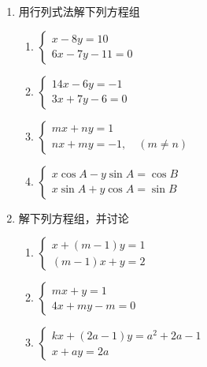 \begin{ex}
\begin{enumerate}
    \item 用行列式法解下列方程组
\begin{enumerate}
    \item $\begin{cases}
        x-8y=10\\6x-7y-11=0
    \end{cases}$
    \item $\begin{cases}
        14x-6y=-1\\ 3x+7y-6=0   
    \end{cases}$
    \item $\begin{cases}
        mx+ny=1\\nx+my=-1,\quad  (m\ne n) 
    \end{cases}$
    \item $\begin{cases}
        x\cos A-y\sin A=\cos B\\ x\sin A+y\cos A=\sin B
    \end{cases}$
\end{enumerate}

    \item 解下列方程组，并讨论
\begin{enumerate}
    \item $\begin{cases}
        x+ (m-1)y=1\\(m-1) x+y=2
    \end{cases}$
    \item $\begin{cases}
        mx+y=1\\ 4x+my-m=0
    \end{cases}$
    \item $\begin{cases}
        kx+ (2a-1) y=a^2+2a-1\\ x+ay=2a
    \end{cases}$
\end{enumerate}
\end{enumerate}   
\end{ex}

